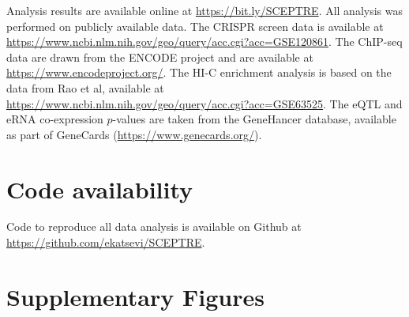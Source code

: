 \documentclass{nature}
\begin{document}
Analysis results are available online at \url{https://bit.ly/SCEPTRE}. All analysis was performed on publicly available data. The CRISPR screen data\cite{Gasperini2019} is available at \url{https://www.ncbi.nlm.nih.gov/geo/query/acc.cgi?acc=GSE120861}. The ChIP-seq data are drawn from the ENCODE project\cite{Dunham2012} and are available at \url{https://www.encodeproject.org/}. The HI-C enrichment analysis is based on the data from Rao et al\cite{Rao2014}, available at \url{https://www.ncbi.nlm.nih.gov/geo/query/acc.cgi?acc=GSE63525}. The eQTL and eRNA co-expression $p$-values are taken from the GeneHancer database\cite{Fishilevich2017}, available as part of GeneCards (\url{https://www.genecards.org/}).

\section*{Code availability}

Code to reproduce all data analysis is available on Github at \url{https://github.com/ekatsevi/SCEPTRE}.

\clearpage 

\appendix
\thispagestyle{empty} 
\addtocounter{page}{-1}

\section{Supplementary Figures}
\renewcommand{\thesection}{S}

\vspace{0.25in}




\thispagestyle{empty}
\end{document}

